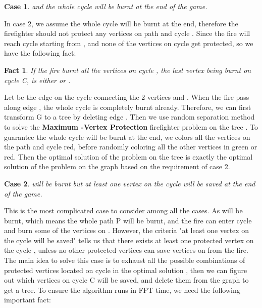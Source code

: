 \documentclass[11pt,letter]{article}
\newtheorem{Fact}{Fact}
\newtheorem{Case}{Case}
\begin{document}
\begin{Case}
 and the whole cycle  will be burnt at the end of the game.
\end{Case}

 In case 2, we assume the whole cycle  will be burnt at the end, therefore the firefighter should not protect any vertices on path  and cycle . Since the fire will reach cycle  starting from , and none of the vertices on cycle  get protected, so we have the following fact:

\begin{Fact}
If the fire burnt all the vertices on cycle , the last vertex being burnt on cycle C, is either  or .
\end{Fact}

Let  be the edge on the cycle  connecting the 2 vertices  and . When the fire pass along edge , the whole cycle  is completely burnt already. Therefore, we can first transform G to a tree  by deleting edge . Then we use random separation method to solve the \textbf{Maximum -Vertex Protection} firefighter problem on the tree . To guarantee the whole cycle  will be burnt at the end, we colors all the vertices on the path  and cycle  red, before randomly coloring all the other vertices in green or red. Then the optimal solution  of the problem on the tree  is exactly the optimal solution  of the problem on the graph  based on the requirement of case 2.



\begin{Case}
 will be burnt but at least one vertex on the cycle  will be saved at the end of the game.
\end{Case}

This is the most complicated case to consider among all the cases. As  will be burnt, which means the whole path P will be burnt, and the fire can enter cycle  and burn some of the vertices on . However, the criteria "at least one vertex on the cycle  will be saved" tells us that there exists at least one protected vertex on the cycle , unless no other protected vertices can save vertices on  from the fire.\\

The main idea to solve this case is to exhaust all the possible combinations of protected vertices located on cycle  in the optimal solution , then we can figure out which vertices on cycle C will be saved, and delete them from the graph to get a tree. To ensure the algorithm runs in FPT time, we need the following important fact:
\end{document}
